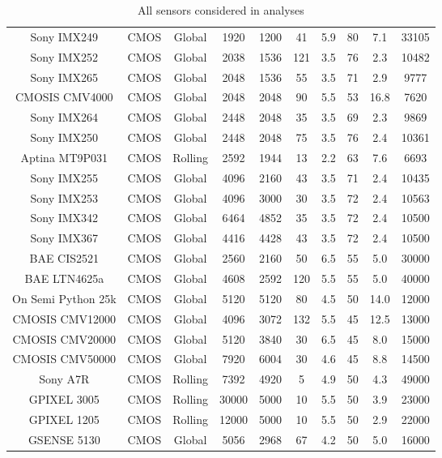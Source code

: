 \begin{table}[t]
{\begin{tabular}{cccccccccc}
Sony IMX249 & CMOS & Global & 1920 & 1200 & 41 & 5.9 & 80 & 7.1 & 33105\\ 
Sony IMX252 & CMOS & Global & 2038 & 1536 & 121 & 3.5 & 76 & 2.3 & 10482\\ 
Sony IMX265 & CMOS & Global & 2048 & 1536 & 55 & 3.5 & 71 & 2.9 & 9777\\ 
CMOSIS CMV4000 & CMOS & Global & 2048 & 2048 & 90 & 5.5 & 53 & 16.8 & 7620\\ 
Sony IMX264 & CMOS & Global & 2448 & 2048 & 35 & 3.5 & 69 & 2.3 & 9869\\ 
Sony IMX250 & CMOS & Global & 2448 & 2048 & 75 & 3.5 & 76 & 2.4 & 10361\\ 
Aptina MT9P031 & CMOS & Rolling & 2592 & 1944 & 13 & 2.2 & 63 & 7.6 & 6693\\ 
Sony IMX255 & CMOS & Global & 4096 & 2160 & 43 & 3.5 & 71 & 2.4 & 10435\\ 
Sony IMX253 & CMOS & Global & 4096 & 3000 & 30 & 3.5 & 72 & 2.4 & 10563\\ 
Sony IMX342 & CMOS & Global & 6464 & 4852 & 35 & 3.5 & 72 & 2.4 & 10500\\ 
Sony IMX367 & CMOS & Global & 4416 & 4428 & 43 & 3.5 & 72 & 2.4 & 10500\\ 
BAE CIS2521 & CMOS & Global & 2560 & 2160 & 50 & 6.5 & 55 & 5.0 & 30000\\ 
BAE LTN4625a & CMOS & Global & 4608 & 2592 & 120 & 5.5 & 55 & 5.0 & 40000\\ 
On Semi Python 25k & CMOS & Global & 5120 & 5120 & 80 & 4.5 & 50 & 14.0 & 12000\\ 
CMOSIS CMV12000 & CMOS & Global & 4096 & 3072 & 132 & 5.5 & 45 & 12.5 & 13000\\ 
CMOSIS CMV20000 & CMOS & Global & 5120 & 3840 & 30 & 6.5 & 45 & 8.0 & 15000\\ 
CMOSIS CMV50000 & CMOS & Global & 7920 & 6004 & 30 & 4.6 & 45 & 8.8 & 14500\\ 
Sony A7R & CMOS & Rolling & 7392 & 4920 & 5 & 4.9 & 50 & 4.3 & 49000\\ 
GPIXEL 3005 & CMOS & Rolling & 30000 & 5000 & 10 & 5.5 & 50 & 3.9 & 23000\\ 
GPIXEL 1205 & CMOS & Rolling & 12000 & 5000 & 10 & 5.5 & 50 & 2.9 & 22000\\ 
GSENSE 5130 & CMOS & Global & 5056 & 2968 & 67 & 4.2 & 50 & 5.0 & 16000\\ 

\end{tabular}%
}
\caption{All sensors considered in analyses}
\label{table:all_sensors}
\end{table}
